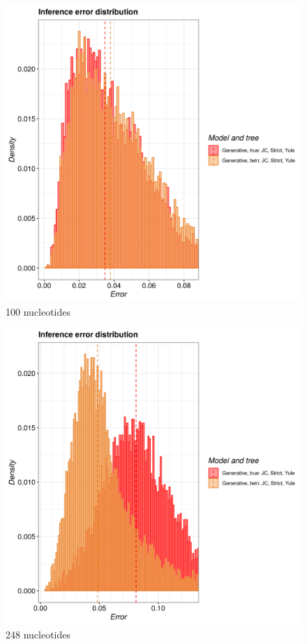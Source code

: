 \begin{figure}[H]
  \includegraphics[width=\textwidth]{pirouette_example_21/example_21_314/errors.png}
  \caption{100 nucleotides}
\end{figure}

\begin{figure}[H]
  \includegraphics[width=\textwidth]{pirouette_example_21/example_21_315/errors.png}
  \caption{248 nucleotides}
\end{figure}

